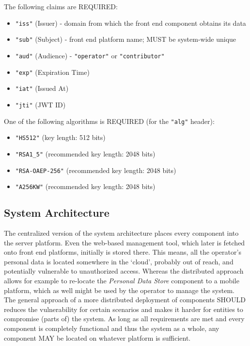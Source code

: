 \documentclass[12pt,english,a4paper,titlepage,cleardoublepage=empty,dottedtoc]{report}
\providecommand{\tightlist}{%
  \setlength{\itemsep}{0pt}\setlength{\parskip}{0pt}}
\begin{document}
The following claims are REQUIRED:

\begin{itemize}
\tightlist
\item
  \texttt{"iss"} (Issuer) - domain from which the front end component
  obtains its data
\item
  \texttt{"sub"} (Subject) - front end platform name; MUST be
  system-wide unique
\item
  \texttt{"aud"} (Audience) - \texttt{"operator"} or
  \texttt{"contributor"}
\item
  \texttt{"exp"} (Expiration Time)
\item
  \texttt{"iat"} (Issued At)
\item
  \texttt{"jti"} (JWT ID)
\end{itemize}

One of the following algorithms is REQUIRED (for the \texttt{"alg"}
header):

\begin{itemize}
\tightlist
\item
  \texttt{"HS512"} (key length: 512 bits)
\item
  \texttt{"RSA1\_5"} (recommended key length: 2048 bits)
\item
  \texttt{"RSA-OAEP-256"} (recommended key length: 2048 bits)
\item
  \texttt{"A256KW"} (recommended key length: 2048 bits)
\end{itemize}

\hypertarget{system-architecture}{\subsection{System
Architecture}\label{system-architecture}}

The centralized version of the system architecture places every
component into the server platform. Even the web-based management tool,
which later is fetched onto front end platforms, initially is stored
there. This means, all the operator's personal data is located somewhere
in the `cloud', probably out of reach, and potentially vulnerable to
unauthorized access. Whereas the distributed approach allows for example
to re-locate the \emph{Personal Data Store} component to a mobile
platform, which as well might be used by the operator to manage the
system. The general approach of a more distributed deployment of
components SHOULD reduces the vulnerability for certain scenarios and
makes it harder for entities to compromise (parts of) the system. As
long as all requirements are met and every component is completely
functional and thus the system as a whole, any component MAY be located
on whatever platform is sufficient.
\end{document}

